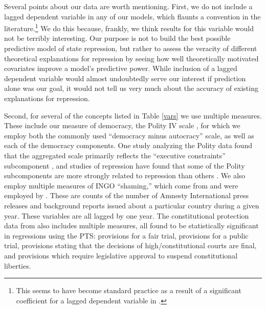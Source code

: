 \documentclass[12pt]{article}
\begin{document}
Several points about our data are worth mentioning. First, we do not include a lagged dependent variable in any of our models, which flaunts a convention in the literature.\footnote{This seems to have become standard practice as a result of a significant coefficient for a lagged dependent variable in \citet{PoeTate1994}.} We do this because, frankly, we think results for this variable would not be terribly interesting. Our purpose is not to build the best possible predictive model of state repression, but rather to assess the veracity of different theoretical explanations for repression by seeing how well theoretically motivated covariates improve a model's predictive power. While inclusion of a lagged dependent variable would almost undoubtedly serve our interest if prediction alone was our goal, it would not tell us very much about the accuracy of existing explanations for repression. 

Second, for several of the concepts listed in Table \ref{vars} we use multiple measures. These include our measure of democracy, the Polity IV scale \citep{MarshallJaggers2009}, for which we employ both the commonly used ``democracy minus autocracy'' scale, as well as each of the democracy components. One study analyzing the Polity data found that the aggregated scale primarily reflects the ``executive constraints'' subcomponent \citep{GleditschWard1997}, and studies of repression have found that some of the Polity subcomponents are more strongly related to repression than others \citep{Keith2002PRQ, BDMetal2005}. We also employ multiple measures of INGO ``shaming,'' which come from \citet{RonRamosRodgers2005} and were employed by \citet{HafnerBurton2008}. These are counts of the number of Amnesty International press releases and background reports issued about a particular country during a given year. These variables are all lagged by one year. The constitutional protection data from \citet{KeithTatePoe2009} also includes multiple measures, all found to be statistically significant in regressions using the PTS: provisions for a fair trial, provisions for a public trial, provisions stating that the decisions of high/constitutional courts are final, and provisions which require legislative approval to suspend constitutional liberties. 
\end{document}
